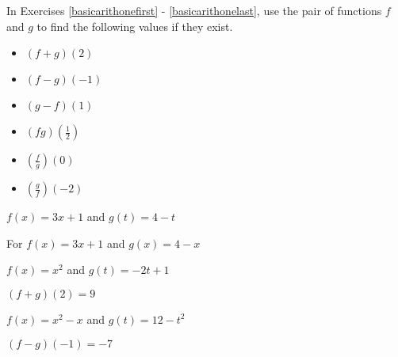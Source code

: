 \documentclass{ximera}
\begin{document}
	\author{Stitz-Zeager}



\label{ExercisesforFunctionArithmetic}

In Exercises \ref{basicarithonefirst} - \ref{basicarithonelast}, use the pair of functions $f$ and $g$ to find the following values if they exist.


\begin{itemize}

\item  $(f+g)(2)$ 
\item  $(f-g)(-1)$
\item  $(g-f)(1)$

\end{itemize}



\begin{itemize}

\item  $(fg)\left(\frac{1}{2}\right)$
\item  $\left(\frac{f}{g}\right)(0)$
\item  $\left(\frac{g}{f}\right)\left(-2\right)$

\end{itemize}






\begin{question}
$f(x) = 3x+1$ and  $g(t) = 4-t$
\begin{solution}
For  $f(x) = 3x+1$ and $g(x) = 4-x$


\end{solution}

\end{question}

\begin{question}
$f(x) = x^2$ and $g(t) = -2t+1$

\begin{solution}
$(f+g)(2) = 9$
\end{solution}

\end{question}

\begin{question}
$f(x) = x^2 - x$ and  $g(t) = 12-t^2$
\begin{solution}
$(f-g)(-1) = -7$
\end{solution}

\end{question}
\end{document}
